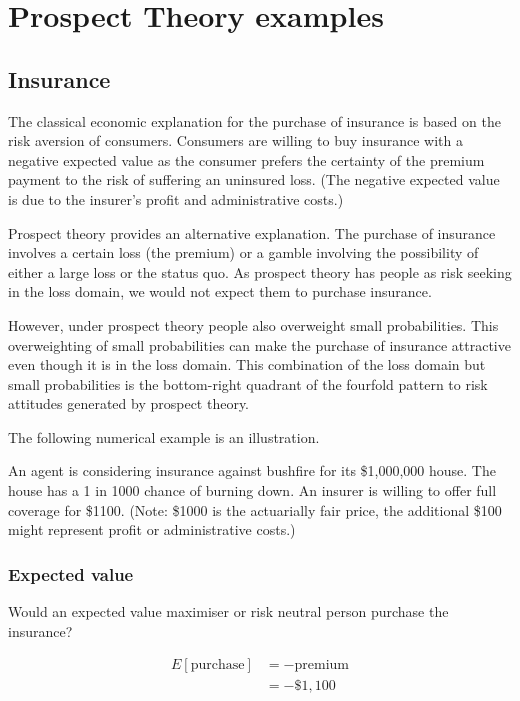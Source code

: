 \documentclass[
  letterpaper,
  DIV=11,
  numbers=noendperiod]{scrreprt}
\begin{document}
\hypertarget{prospect-theory-examples}{%
\chapter{Prospect Theory examples}\label{prospect-theory-examples}}

\hypertarget{insurance}{%
\section{Insurance}\label{insurance}}

The classical economic explanation for the purchase of insurance is
based on the risk aversion of consumers. Consumers are willing to buy
insurance with a negative expected value as the consumer prefers the
certainty of the premium payment to the risk of suffering an uninsured
loss. (The negative expected value is due to the insurer's profit and
administrative costs.)

Prospect theory provides an alternative explanation. The purchase of
insurance involves a certain loss (the premium) or a gamble involving
the possibility of either a large loss or the status quo. As prospect
theory has people as risk seeking in the loss domain, we would not
expect them to purchase insurance.

However, under prospect theory people also overweight small
probabilities. This overweighting of small probabilities can make the
purchase of insurance attractive even though it is in the loss domain.
This combination of the loss domain but small probabilities is the
bottom-right quadrant of the fourfold pattern to risk attitudes
generated by prospect theory.

The following numerical example is an illustration.

An agent is considering insurance against bushfire for its \$1,000,000
house. The house has a 1 in 1000 chance of burning down. An insurer is
willing to offer full coverage for \$1100. (Note: \$1000 is the
actuarially fair price, the additional \$100 might represent profit or
administrative costs.)

\hypertarget{expected-value-1}{%
\subsection{Expected value}\label{expected-value-1}}

Would an expected value maximiser or risk neutral person purchase the
insurance?

\begin{align*}
E[\text{purchase}]&=-\text{premium} \\
&=-\$1,100
\end{align*}
\end{document}
